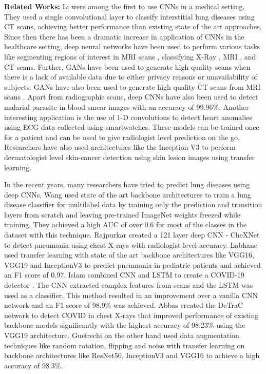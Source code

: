 \documentclass[10pt,twocolumn,letterpaper]{article}
\begin{document}
\textbf{Related Works:} 
Li \etal \cite{li2014medical} were among the first
to use CNNs in a medical setting. They used a single convolutional layer to classify 
interstitial lung diseases using CT scans, achieving better performance than existing state of 
the art approaches. Since then there has been a dramatic increase in application of CNNs 
in the healthcare setting, deep neural networks have been used to perform various tasks like 
segmenting regions of interest in MRI scans \cite{kayalibay2017cnn,dolz2018hyperdense}, classifying X-Ray   
\cite{rajpurkar2017chexnet}, MRI \cite{farooq2017deep}, and CT \cite{alakwaa2017lung} scans.
Further, GANs have been used to generate high quality scans \cite{loey2020within} 
when there is a lack of available data due to either privacy reasons or unavailability of subjects. 
GANs have also been used to generate high quality CT scans from MRI scans 
\cite{liu2021ct}. Apart from radiographic scans,
deep CNNs have also been used to detect malarial parasite in blood smear images 
\cite{umer2020novel} with an accuracy of 99.96\%. Another interesting 
application is the use of 1-D convolutions to detect heart anomalies using ECG data
\cite{kiranyaz2015real} collected using smartwatches. These models can be trained once for 
a patient and can be used to give radiologist level prediction on the go. 
Researchers have also used architectures like the Inception V3 to perform 
dermatologist level skin-cancer detection using skin lesion images \cite{esteva2017dermatologist} using transfer 
learning.  

In the recent years, many researchers have tried to predict lung diseases using deep CNNs, 
Wang \etal \cite{wang2017chestx} used state of the art backbone architectures to train 
a lung disease classifier for multilabel data by training only the prediction and transition 
layers from scratch and leaving pre-trained ImageNet weights freezed while training. 
They achieved a high AUC of over 0.6 for most of the classes in the dataset with this technique.
Rajpurkar \etal \cite{rajpurkar2017chexnet} created a 121 layer deep CNN - CheXNet to detect
pneumonia using chest X-rays with radiologist level accuracy. 
Labhane \etal \cite{labhane2020detection} used transfer learning with state of the art backbone architectures like VGG16, 
VGG19 and InceptionV3 to predict pneumonia in pediatric patients and achieved an F1 score of 0.97.
Islam \etal combined CNN and LSTM 
to create a COVID-19 detector \cite{islam2020combined}. The CNN extracted complex features from scans and the LSTM was 
used as a classifier. This method resulted in an improvement over a vanilla CNN network and 
an F1 score of 98.9\% was achieved. Abbas \etal \cite{abbas2021classification} created the 
DeTraC network to detect COVID in chest X-rays that improved performance of existing backbone 
models significantly with the highest accuracy of 98.23\% using the VGG19 architecture.  
Guefrechi \etal \cite{guefrechi2021deep} on the other hand used data augmentation techniques like random rotation, 
flipping and noise with transfer learning on backbone architectures like ResNet50, 
InceptionV3 and VGG16 to achieve a high accuracy of 98.3\%.
\end{document}
